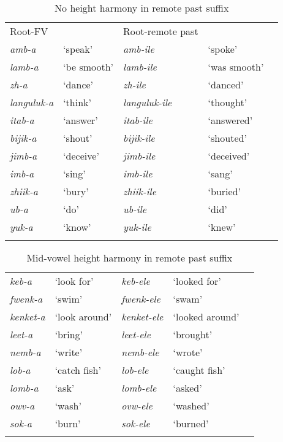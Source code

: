 \documentclass[output=paper]{langsci/langscibook}
\begin{document}
\begin{table}
\begin{tabular}{lllll}
\lsptoprule
Root-FV & & Root-remote past & & \\
\textit{amb-a} & ‘speak’ & \textit{amb-ile} & ‘spoke’ & \\
\textit{lamb-a} & ‘be smooth’ & \textit{lamb-ile} & ‘was smooth’ & \\
\textit{zh-a} & ‘dance’ & \textit{zh-ile} & ‘danced’ & \\
\textit{languluk-a } & ‘think’ &\textit{languluk-ile} & ‘thought’ & \\
\textit{itab-a } & ‘answer’ &\textit{itab-ile } & ‘answered’ & \\
\textit{bijik-a } & ‘shout’ & \textit{bijik-ile } & ‘shouted’ & \\
\textit{jimb-a } & ‘deceive’ & \textit{jimb-ile } & ‘deceived’ & \\
\textit{imb-a } & ‘sing’ & \textit{imb-ile } & ‘sang’ & \\
\textit{zhiik-a } & ‘bury’ & \textit{zhiik-ile } & ‘buried’ & \\
\textit{ub-a } & ‘do’ & \textit{ub-ile } & ‘did’ & \\
\textit{yuk-a } & ‘know’ &\textit{yuk-ile } & ‘knew’ & \\
\lspbottomrule
\end{tabular}

\caption{No height harmony in remote past suffix}
\label{tab:2.kawasha}

 \end{table}



\begin{table}
\begin{tabular}{lllll}
\lsptoprule
\textit{keb-a}   & ‘look for’    & \textit{keb-ele}    & ‘looked for’    &  \\
\textit{fwenk-a} & ‘swim’    & \textit{fwenk-ele}  & ‘swam’  &  \\
\textit{kenket-a}    & ‘look around’ & \textit{kenket-ele} & ‘looked around’ &  \\
\textit{leet-a}  & ‘bring’   & \textit{leet-ele}   & ‘brought’   &  \\
\textit{nemb-a}  & ‘write’   & \textit{nemb-ele}   & ‘wrote’ &  \\
\textit{lob-a}   & ‘catch fish’  & \textit{lob-ele}    & ‘caught fish’   &  \\
\textit{lomb-a}  & ‘ask’ & \textit{lomb-ele}   & ‘asked’ &  \\
\textit{owv-a}   & ‘wash’    & \textit{ovw-ele}    & ‘washed’    &  \\
\textit{sok-a}   & ‘burn’    & \textit{sok-ele}    & ‘burned’    & \\
\lspbottomrule
\end{tabular}

\caption{ Mid-vowel height harmony in remote past suffix}
\label{tab:3.kawasha}

 \end{table}
\end{document}

